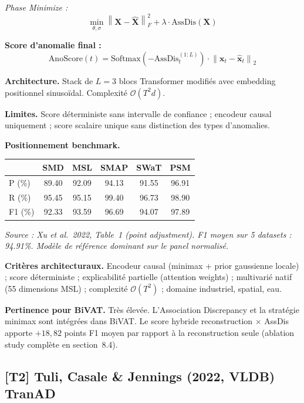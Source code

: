 \documentclass[12pt,a4paper]{article}
\begin{document}
\textit{Phase Minimize :}
$$\min_{\theta,\sigma}\left\|\mathbf{X} - \hat{\mathbf{X}}\right\|_F^2
+ \lambda\cdot\mathrm{AssDis}(\mathbf{X})$$

\textbf{Score d'anomalie final :}
$$\mathrm{AnoScore}(t) = \mathrm{Softmax}\!\left(
-\mathrm{AssDis}^{(1:L)}_t\right)\cdot
\left\|\mathbf{x}_t - \hat{\mathbf{x}}_t\right\|_2$$

\textbf{Architecture.} Stack de $L = 3$ blocs Transformer modifiés avec
embedding positionnel sinusoïdal. Complexité $\mathcal{O}(T^2 d)$.

\textbf{Limites.} Score déterministe sans intervalle de confiance ; encodeur
causal uniquement ; score scalaire unique sans distinction des types d'anomalies.

\textbf{Positionnement benchmark.}

\smallskip
\begin{center}
\small
\begin{tabular}{lccccc}
\toprule
& SMD & MSL & SMAP & SWaT & PSM \\
\midrule
P (\%) & 89.40 & 92.09 & 94.13 & 91.55 & 96.91 \\
R (\%) & 95.45 & 95.15 & 99.40 & 96.73 & 98.90 \\
F1 (\%) & 92.33 & 93.59 & 96.69 & 94.07 & 97.89 \\
\bottomrule
\end{tabular}
\end{center}
\smallskip
\noindent\textit{\small Source : Xu et al.\ 2022, Table~1 (point adjustment).
F1 moyen sur 5 datasets : 94.91\%. Modèle de référence dominant sur le panel
normalisé.}

\textbf{Critères architecturaux.} Encodeur causal (minimax + prior gaussienne
locale) ; score déterministe ; explicabilité partielle (attention weights) ;
multivarié natif (55 dimensions MSL) ; complexité $\mathcal{O}(T^2)$ ;
domaine industriel, spatial, eau.

\textbf{Pertinence pour BiVAT.} Très élevée. L'Association Discrepancy et la
stratégie minimax sont intégrées dans BiVAT. Le score hybride reconstruction
$\times$ AssDis apporte $+18{,}82$ points F1 moyen par rapport à la
reconstruction seule (ablation study complète en section~8.4).

\subsection{[T2] Tuli, Casale \& Jennings (2022, VLDB)  TranAD}
\end{document}
